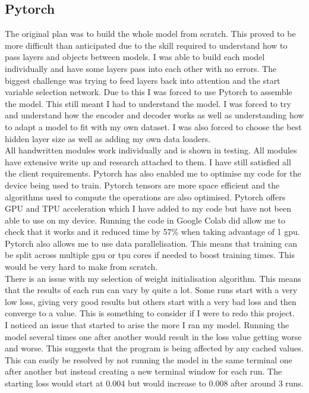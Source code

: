 \documentclass{article}
\begin{document}
\subsection{Pytorch}
The original plan was to build the whole model from scratch. This proved to be more
difficult than anticipated due to the skill required to understand how to pass
layers and objects between models. I was able to build each model individually
and have some layers pass into each other with no errors. The biggest challenge
was trying to feed layers back into attention and the start variable selection
network. Due to this I was forced to use Pytorch to assemble the model. This still
meant I had to understand the model. I was forced to try and understand how the
encoder and decoder works as well as understanding how to adapt a model to fit
with my own dataset. I was also forced to choose the best hidden layer size as well
as adding my own data loaders.
\\
All handwritten modules work individually and is shown in testing. All
modules have extensive write up and research attached to them. I have still
satisfied all the client requirements. Pytorch has also enabled me to optimise
my code for the device being used to train. Pytorch tensors are more space efficient
and the algorithms used to compute the operations are also optimised. Pytorch offers
GPU and TPU acceleration which I have added to my code but have not been able to
use on my device. Running the code in Google Colab did allow me to check that it works
and it reduced time by 57\% when taking advantage of 1 gpu. Pytorch also allows me
to use data parallelisation. This means that training can be split across multiple
gpu or tpu cores if needed to boost training times. This would be very hard to make
from scratch.
\\
There is an issue with my selection of weight initialisation algorithm. This means
that the results of each run can vary by quite a lot. Some runs start with a very
low loss, giving very good results but others start with a very bad loss and then
converge to a value. This is something to consider if I were to redo this project.
\\
I noticed an issue that started to arise the more I ran my model. Running the
model several times one after another would result in the loss value getting
worse and worse. This suggests that the program is being affected by any cached
values. This can easily be resolved by not running the model in the same terminal
one after another but instead creating a new terminal window for each run.
The starting loss would start at 0.004 but would increase to 0.008 after around 3
runs.
\end{document}
